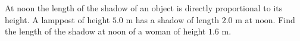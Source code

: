 At noon the length of the shadow of an object is directly proportional to its height. A lamppost of height $5.0$ m has a shadow of length $2.0$ m at noon. Find the length of the shadow at noon of a woman of height $1.6$ m.
